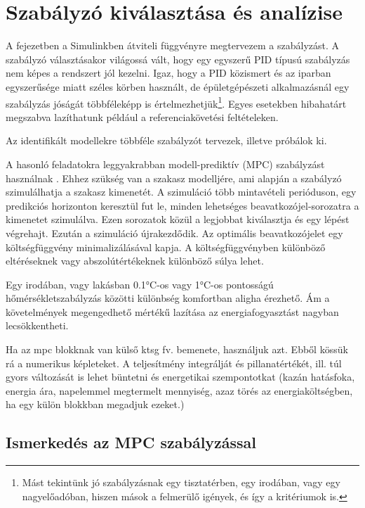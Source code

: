 \chapter{Szabályzó kiválasztása és analízise}\label{chap:control}

A fejezetben a Simulinkben átviteli függvényre megtervezem a szabályzást. A szabályzó választásakor világossá vált, hogy egy egyszerű PID típusú szabályzás nem képes a rendszert jól kezelni. Igaz, hogy a PID közismert és az iparban egyszerűsége miatt széles körben használt, de épületgépészeti alkalmazásnál egy szabályzás jóságát többféleképp is értelmezhetjük\footnote{Mást tekintünk jó szabályzásnak egy tisztatérben, egy irodában, vagy egy nagyelőadóban, hiszen mások a felmerülő igények, és így a kritériumok is.}. Egyes esetekben hibahatárt megszabva lazíthatunk például a referenciakövetési feltételeken.

Az identifikált modellekre többféle szabályzót tervezek, illetve próbálok ki.

A hasonló feladatokra leggyakrabban modell-prediktív (MPC) szabályzást használnak \cite{AFRAM2014343}. Ehhez szükség van a szakasz modelljére, ami alapján a szabályzó szimulálhatja a szakasz kimenetét. A szimuláció több mintavételi perióduson, egy predikciós horizonton keresztül fut le, minden lehetséges  beavatkozójel-sorozatra a kimenetet szimulálva.
Ezen sorozatok közül a legjobbat kiválasztja és egy lépést végrehajt. Ezután a szimuláció újrakezdődik. Az optimális beavatkozójelet egy költségfüggvény minimalizálásával kapja. A költségfüggvényben különböző eltéréseknek vagy abszolútértékeknek különböző súlya lehet.

Egy irodában, vagy lakásban 0.1\si{\celsius}-os vagy 1\si{\celsius}-os pontosságú hőmérsékletszabályzás közötti különbség komfortban aligha érezhető. Ám a követelmények megengedhető mértékű lazítása az energiafogyasztást nagyban lecsökkentheti.

\begin{formal}
	Ha az mpc blokknak van külső ktsg fv. bemenete, használjuk azt. Ebből kössük rá a numerikus képleteket. A teljesítmény integrálját és pillanatértékét, ill. túl gyors változását is lehet büntetni és energetikai szempontotkat (kazán hatásfoka, energia ára, napelemmel megtermelt mennyiség, azaz törés az energiaköltségben, ha egy külön blokkban megadjuk ezeket.)
\end{formal}

\section{Ismerkedés az MPC szabályzással}

